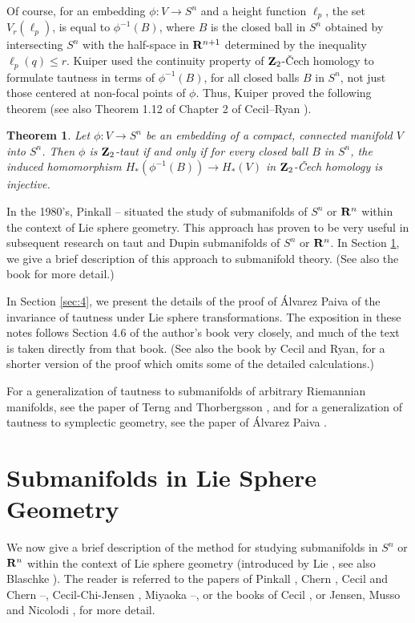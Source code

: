 \documentclass[12pt]{article}
\newtheorem{theorem}{Theorem}[section]
\begin{document}
Of course, for an embedding $\phi:V \rightarrow S^n$ and a height function 
$\ell_p$, the set 
$V_r(\ell_p)$, is equal to $\phi^{-1}(B)$, where $B$ is the closed ball in $S^n$ obtained by intersecting
$S^n$ with the half-space in ${\bf R}^{n+1}$ determined by the inequality $\ell_p (q) \leq r$.
Kuiper \cite{Ku4} used the 
continuity property of ${\bf Z}_2$-\v{C}ech homology 
to formulate tautness in terms
of $\phi^{-1}(B)$, for all closed balls $B$ in $S^n$, not just those centered at non-focal points of $\phi$.  
Thus, Kuiper proved
the following theorem (see also Theorem 1.12 of Chapter 2 of Cecil--Ryan \cite[p. 118]{CR7}).    
\begin{theorem}
\label{thm:3.6.2} 
Let $\phi:V \rightarrow S^n$ be an embedding of a compact, connected manifold $V$ into $S^n$. Then
$\phi$ is ${\bf Z}_2$-taut if and only if for every closed ball $B$ in $S^n$, the induced homomorphism
$H_*(\phi^{-1}(B)) \rightarrow H_*(V)$ in ${\bf Z}_2$-\v{C}ech homology is injective.
\end{theorem}



In the 1980's,
Pinkall \cite{P3}--\cite{P4} situated the study of submanifolds of $S^n$ or ${\bf R}^n$ within the context of Lie sphere 
geometry.  
This approach has proven to be very useful in subsequent research on 
taut and Dupin submanifolds of $S^n$ or ${\bf R}^n$.  In Section \ref{sec:3}, we give a brief description of this approach to submanifold theory. (See 
also the book \cite{Cec1} for more detail.)


In Section \ref{sec:4}, we present the details of the proof of \'{A}lvarez Paiva \cite{Alv} of the invariance of tautness under Lie sphere transformations. The exposition in these notes follows Section 4.6 of the author's book \cite[pp. 82-95]{Cec1} very closely, and much of the text is taken directly from that book.  (See also the book 
\cite[pp. 224--231]{CR8} by Cecil and Ryan,
for a shorter version of the proof which omits some of the detailed calculations.)


For a generalization of tautness to
submanifolds of arbitrary Riemannian manifolds, see the paper of Terng and Thorbergsson \cite{TTh1}, and for a generalization of tautness to symplectic geometry, see the paper of \'{A}lvarez Paiva \cite{Alv-99}.


\section{Submanifolds in Lie Sphere Geometry}
\label{sec:3}
We now give a brief description of the method for studying submanifolds
in $S^n$ or ${\bf R}^n$ within the context of Lie sphere geometry
(introduced by Lie \cite{Lie}, see also Blaschke \cite{Bl}).  The reader is referred to the papers of
Pinkall \cite{P4}, Chern \cite{Chern}, Cecil and Chern \cite{CC1}--\cite{CC2},
Cecil-Chi-Jensen \cite{CCJ2},  Miyaoka \cite{Mi1}--\cite{Mi4},
or the books of Cecil \cite{Cec1}, or
Jensen, Musso and Nicolodi \cite{Jensen-Musso-Nicolodi}, for more detail.
\end{document}
